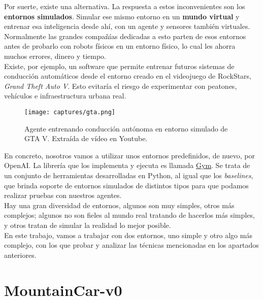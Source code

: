 \documentclass[11pt,fleqn]{book} %
\begin{document}
Por suerte, existe una alternativa. La respuesta a estos inconvenientes son los \textbf{entornos simulados}. Simular ese mismo entorno en un \textbf{mundo virtual} y entrenar esa inteligencia desde ahí, con un agente y sensores también virtuales. Normalmente las grandes compañías dedicadas a esto parten de esos entornos antes de probarlo con robots físicos en un entorno físico, lo cual les ahorra muchos errores, dinero y tiempo. \\

Existe, por ejemplo, un software que permite entrenar futuros sistemas de conducción automáticos desde el entorno creado en el videojuego de RockStars, \textit{Grand Theft Auto V}. Esto evitaría el riesgo de experimentar con peatones, vehículos e infraestructura urbana real. \\

\begin{figure}[H]
	\centering\texttt{[image: captures/gta.png]}
	\caption{Agente entrenando conducción autónoma en entorno simulado de GTA V. Extraída de vídeo en Youtube. \cite{article:gta}}
	\label{fig:gta} %
\end{figure}

En concreto, nosotros vamos a utilizar unos entornos predefinidos, de nuevo, por OpenAI. La librería que los implementa y ejecuta es llamada \href{https://gym.openai.com/}{Gym}. Se trata de un conjunto de herramientas desarrolladas en Python, al igual que los \textit{baselines}, que brinda soporte de entornos simulados de distintos tipos para que podamos realizar pruebas con nuestros agentes. \\

Hay una gran diversidad de entornos, algunos son muy simples, otros más complejos; algunos no son fieles al mundo real tratando de hacerlos más simples, y otros tratan de simular la realidad lo mejor posible. \\

En este trabajo, vamos a trabajar con dos entornos, uno simple y otro algo más complejo, con los que probar y analizar las técnicas mencionadas en los apartados anteriores. \cite{article:gym} \cite{article:entornos}

\section{MountainCar-v0}\label{sec:mountaincar}
\end{document}
